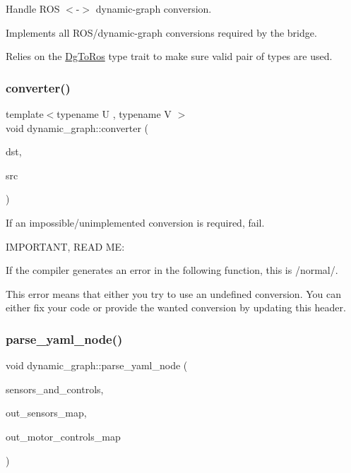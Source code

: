Handle R\+OS $<$-\/$>$ dynamic-\/graph conversion. 

Implements all R\+O\+S/dynamic-\/graph conversions required by the bridge.

Relies on the \hyperlink{classdynamic__graph_1_1DgToRos}{Dg\+To\+Ros} type trait to make sure valid pair of types are used. \mbox{\label{namespacedynamic__graph_a38ff488b8b21c0b4f4d7f44572fa4ee5}} 
\subsubsection{\texorpdfstring{converter()}{converter()}\hspace{0.1cm}{\footnotesize\ttfamily [2/2]}}
{\footnotesize\ttfamily template$<$typename U , typename V $>$ \\
void dynamic\+\_\+graph\+::converter (\begin{DoxyParamCaption}\item[{U \&}]{dst,  }\item[{V \&}]{src }\end{DoxyParamCaption})\hspace{0.3cm}{\ttfamily [inline]}}



If an impossible/unimplemented conversion is required, fail. 

I\+M\+P\+O\+R\+T\+A\+NT, R\+E\+AD ME\+:

If the compiler generates an error in the following function, this is /normal/.

This error means that either you try to use an undefined conversion. You can either fix your code or provide the wanted conversion by updating this header. \mbox{\label{namespacedynamic__graph_a3473e2d5502f8a2bff6b43cbc2d35e07}} 
\subsubsection{\texorpdfstring{parse\+\_\+yaml\+\_\+node()}{parse\_yaml\_node()}}
{\footnotesize\ttfamily void dynamic\+\_\+graph\+::parse\+\_\+yaml\+\_\+node (\begin{DoxyParamCaption}\item[{const Y\+A\+M\+L\+::\+Node \&}]{sensors\+\_\+and\+\_\+controls,  }\item[{\hyperlink{namespacedynamic__graph_abd184187f3bc15df5e227d866529e4a7}{Vector\+D\+G\+Map} \&}]{out\+\_\+sensors\+\_\+map,  }\item[{\hyperlink{namespacedynamic__graph_abd184187f3bc15df5e227d866529e4a7}{Vector\+D\+G\+Map} \&}]{out\+\_\+motor\+\_\+controls\+\_\+map }\end{DoxyParamCaption})}



